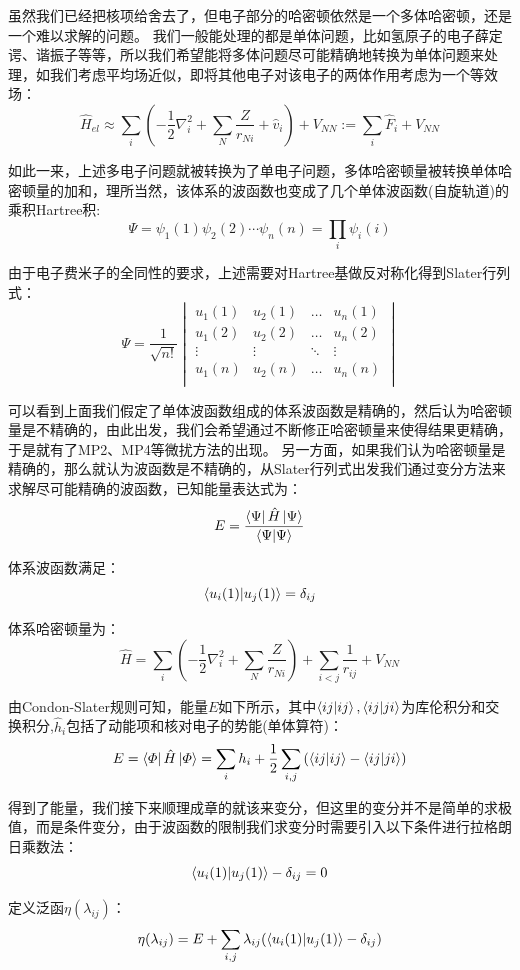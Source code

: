 虽然我们已经把核项给舍去了，但电子部分的哈密顿依然是一个多体哈密顿，还是一个难以求解的问题。
我们一般能处理的都是单体问题，比如氢原子的电子薛定谔、谐振子等等，所以我们希望能将多体问题尽可能精确地转换为单体问题来处理，如我们考虑平均场近似，即将其他电子对该电子的两体作用考虑为一个等效场：
\[\hat{H}_{el} \approx \sum_i\left(-\frac{1}{2}\nabla^2_i+\sum_N\frac{Z}{r_{Ni}}+\hat{v}_i\right)+V_{NN}:=\sum_i\hat{F}_i + V_{NN}\]

如此一来，上述多电子问题就被转换为了单电子问题，多体哈密顿量被转换单体哈密顿量的加和，理所当然，该体系的波函数也变成了几个单体波函数(自旋轨道)的乘积Hartree积:
\[\Psi = \psi_1(1)\psi_2(2)\cdots\psi_n(n)=\prod_i\psi_i(i)\]

由于电子费米子的全同性的要求，上述需要对Hartree基做反对称化得到Slater行列式：
\[\Psi=\frac{1}{\sqrt{n!}}
    \begin{vmatrix}
        u_1(1) & u_2(1) & \ldots & u_n(1)\\
        u_1(2) & u_2(2) & \ldots & u_n(2)\\
        \vdots & \vdots & \ddots & \vdots\\
        u_1(n) & u_2(n) & \ldots & u_n(n)\\
    \end{vmatrix}
\]

可以看到上面我们假定了单体波函数组成的体系波函数是精确的，然后认为哈密顿量是不精确的，由此出发，我们会希望通过不断修正哈密顿量来使得结果更精确，于是就有了MP2、MP4等微扰方法的出现。
另一方面，如果我们认为哈密顿量是精确的，那么就认为波函数是不精确的，从Slater行列式出发我们通过变分方法来求解尽可能精确的波函数，已知能量表达式为：
\[E=\frac{\bra{\Psi}\hat{H}\ket{\Psi}}{\bra{\Psi}\ket{\Psi}}\]

体系波函数满足：
\[\bra{u_i(1)}\ket{u_j(1)}=\delta_{ij}\]

体系哈密顿量为：
\[\hat{H}=\sum_i\left(-\frac{1}{2}\nabla^2_i+\sum_N\frac{Z}{r_{Ni}}\right)+\sum_{i<j}\frac{1}{r_{ij}}+V_{NN}\]

由Condon-Slater规则可知，能量$E$如下所示，其中$\bra{ij}\ket{ij},\bra{ij}\ket{ji}$为库伦积分和交换积分,$\hat{h}_i$包括了动能项和核对电子的势能(单体算符)：
\[E=\bra{\varPhi}\hat{H}\ket{\varPhi}=\sum_ih_i+\frac{1}{2}\sum_{i,j}\left(\bra{ij}\ket{ij}-\bra{ij}\ket{ji}\right)\]

得到了能量，我们接下来顺理成章的就该来变分，但这里的变分并不是简单的求极值，而是条件变分，由于波函数的限制我们求变分时需要引入以下条件进行拉格朗日乘数法：
\[\bra{u_i(1)}\ket{u_j(1)}-\delta_{ij}=0\]

定义泛函$\eta(\lambda_{ij})$：
\[\eta(\lambda_{ij})=E+\sum_{i,j}\lambda_{ij}(\bra{u_i(1)}\ket{u_j(1)}-\delta_{ij})\]

